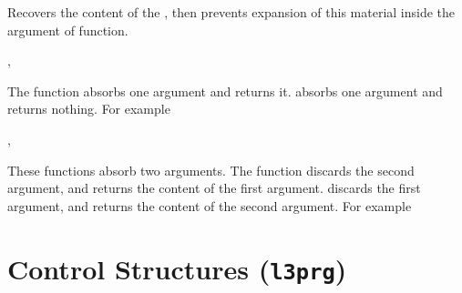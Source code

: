 \documentclass[oneside]{book}
\let\tn=\cs
\begin{document}
\begin{function}{\ExpValue}
\begin{syntax}
 
\end{syntax}
Recovers the content of the , then prevents expansion
of this material inside the argument of  function.
\end{function}

\begin{function}{\UseOne,\GobbleOne}
\begin{syntax}
 
 
\end{syntax}
The function  absorbs one argument and returns it.
 absorbs one argument and returns nothing.
For example
\begin{demo}
\end{demo}
\end{function}

\begin{function}{\UseGobble,\GobbleUse}
\begin{syntax}
  
  
\end{syntax}
These functions absorb two arguments.
The function  discards the second argument,
and returns the content of the first argument.
 discards the first argument,
and returns the content of the second argument.
For example
\begin{demo}
\end{demo}
\end{function}

\chapter{Control Structures (\texttt{l3prg})}
\end{document}
